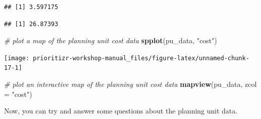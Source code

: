 \documentclass[12pt,]{book}
\newenvironment{Shaded}{\begin{snugshade}}{\end{snugshade}}
\newcommand{\CommentTok}[1]{\textcolor[rgb]{0.56,0.35,0.01}{\textit{#1}}}
\newcommand{\DataTypeTok}[1]{\textcolor[rgb]{0.13,0.29,0.53}{#1}}
\newcommand{\KeywordTok}[1]{\textcolor[rgb]{0.13,0.29,0.53}{\textbf{#1}}}
\newcommand{\NormalTok}[1]{#1}
\newcommand{\OperatorTok}[1]{\textcolor[rgb]{0.81,0.36,0.00}{\textbf{#1}}}
\newcommand{\StringTok}[1]{\textcolor[rgb]{0.31,0.60,0.02}{#1}}
\begin{document}
\begin{Shaded}
\end{Shaded}

\begin{verbatim}
## [1] 3.597175
\end{verbatim}

\begin{Shaded}
\end{Shaded}

\begin{verbatim}
## [1] 26.87393
\end{verbatim}

\begin{Shaded}
\begin{Highlighting}[]
\CommentTok{# plot a map of the planning unit cost data}
\KeywordTok{spplot}\NormalTok{(pu_data, }\StringTok{"cost"}\NormalTok{)}
\end{Highlighting}
\end{Shaded}

\begin{center}\texttt{[image: prioritizr-workshop-manual\_files/figure-latex/unnamed-chunk-17-1]} \end{center}

\begin{Shaded}
\begin{Highlighting}[]
\CommentTok{# plot an interactive map of the planning unit cost data}
\KeywordTok{mapview}\NormalTok{(pu_data, }\DataTypeTok{zcol =} \StringTok{"cost"}\NormalTok{)}
\end{Highlighting}
\end{Shaded}

Now, you can try and answer some questions about the planning unit data.
\end{document}
